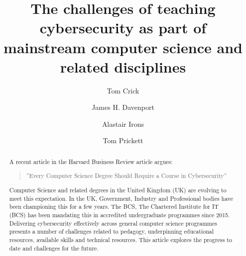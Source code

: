 \documentclass[sigconf]{acmart}
\begin{document}
\title{The challenges of teaching cybersecurity as part of mainstream computer science and related disciplines}




\author{Tom Crick}


\author{James H. Davenport}

\author{Alastair Irons}

\author{Tom Prickett}


\renewcommand{\shortauthors}{Crick, Davenport,  Irons, and Prickett.}
\begin{abstract}
  A recent article in the Harvard Business Review article argues:
  \begin{quote}
      ''Every Computer Science Degree Should Require a Course in Cybersecurity''\cite{cable_2019}
  \end{quote}
   Computer Science and related degrees in the United Kingdom (UK) are evolving to meet this expectation. In the UK, Government, Industry and Professional bodies have been championing this for a few years. The BCS, The Chartered Institute for IT (BCS) has been mandating this in accredited undergraduate programmes since 2015\cite{Cricketal2019}. Delivering cybersecurity effectively across general computer science programmes presents a number of challenges related to pedagogy, underpinning educational resources, available skills and technical resources. This article explores the progress to date and challenges for the future.
\end{abstract}
\end{document}
